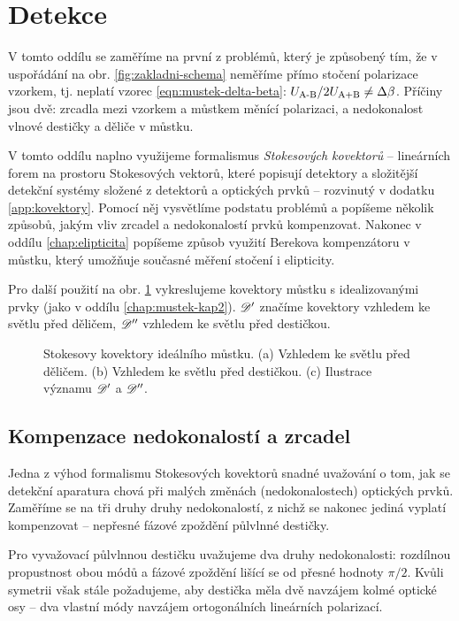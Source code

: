 \section{Detekce}
\label{chap:detekce}

V tomto oddílu se zaměříme na první z problémů, který je způsobený tím, že v uspořádání na obr. \ref{fig:zakladni-schema} neměříme přímo stočení polarizace vzorkem, tj. neplatí vzorec \eqref{eqn:mustek-delta-beta}: $U_\textrm{A-B}/2U_\textrm{A+B}\neq\Delta\beta$.
Příčiny jsou dvě: zrcadla mezi vzorkem a můstkem měnící polarizaci, a nedokonalost vlnové destičky a děliče v můstku.

V tomto oddílu naplno využijeme formalismus \emph{Stokesových kovektorů} -- lineárních forem na prostoru Stokesových vektorů, které popisují detektory a složitější detekční systémy složené z detektorů a optických prvků -- rozvinutý v dodatku \ref{app:kovektory}.
Pomocí něj vysvětlíme podstatu problémů a popíšeme několik způsobů, jakým vliv zrcadel a nedokonalostí prvků kompenzovat.
Nakonec v oddílu \ref{chap:elipticita} popíšeme způsob využití Berekova kompenzátoru v můstku, který umožňuje současné měření stočení i elipticity.

Pro další použití na obr. \ref{fig:kovektor-ideal-mustek} vykreslujeme kovektory můstku s idealizovanými prvky (jako v oddílu \ref{chap:mustek-kap2}).
$\mathscr{D}'$ značíme kovektory vzhledem ke světlu před děličem, $\mathscr{D}''$ vzhledem ke světlu před destičkou.

\begin{figure}[htbp]
    \centering
    \caption{Stokesovy kovektory ideálního můstku. (a) Vzhledem ke světlu před děličem. (b) Vzhledem ke světlu před destičkou. (c) Ilustrace významu $\mathscr{D}'$ a $\mathscr{D}''$.}
    \label{fig:kovektor-ideal-mustek}
\end{figure}

\subsection{Kompenzace nedokonalostí a zrcadel}
Jedna z výhod formalismu Stokesových kovektorů snadné uvažování o tom, jak se detekční aparatura chová při malých změnách (nedokonalostech) optických prvků.
Zaměříme se na tři druhy druhy nedokonalostí, z nichž se nakonec jediná vyplatí kompenzovat -- nepřesné fázové zpoždění půlvlnné destičky.

Pro vyvažovací půlvlnnou destičku uvažujeme dva druhy nedokonalosti: rozdílnou propustnost obou módů a fázové zpoždění lišící se od přesné hodnoty $\pi/2$.
Kvůli symetrii však stále požadujeme, aby destička měla dvě navzájem kolmé optické osy -- dva vlastní módy navzájem ortogonálních lineárních polarizací.


